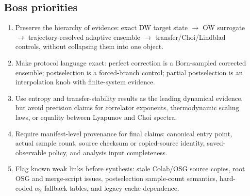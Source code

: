 \documentclass[aps,prb,onecolumn,nofootinbib,superscriptaddress]{revtex4-2}
\begin{document}
\subsection{Boss priorities}

\begin{enumerate}
\item Preserve the hierarchy of evidence: exact DW target state \(\rightarrow\) OW surrogate \(\rightarrow\) trajectory-resolved adaptive ensemble \(\rightarrow\) transfer/Choi/Lindblad controls, without collapsing them into one object.

\item Make protocol language exact: perfect correction is a Born-sampled corrected ensemble; postselection is a forced-branch control; partial postselection is an interpolation knob with finite-system evidence.

\item Use entropy and transfer-stability results as the leading dynamical evidence, but avoid precision claims for correlator exponents, thermodynamic scaling laws, or equality between Lyapunov and Choi spectra.

\item Require manifest-level provenance for final claims: canonical entry point, actual sample count, source checksum or copied-source identity, saved-observable policy, and analysis input completeness.

\item Flag known weak links before synthesis: stale Colab/OSG source copies, root OSG and merge-script issues, postselection sample-count semantics, hard-coded \(\alpha_2\) fallback tables, and legacy cache dependence.
\end{enumerate}
\end{document}
